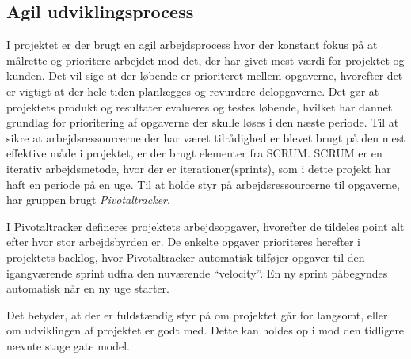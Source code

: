 



\subsection{Agil udviklingsprocess}
I projektet er der brugt en agil arbejdsprocess hvor der konstant fokus på at målrette og prioritere arbejdet mod det, der har givet mest værdi for projektet og kunden. Det vil sige at der løbende er prioriteret mellem opgaverne, hvorefter det er vigtigt at der hele tiden planlægges og revurdere delopgaverne. Det gør at projektets produkt og resultater evalueres og testes løbende, hvilket har dannet grundlag for prioritering af opgaverne der skulle løses i den næste periode. Til at sikre at arbejdsressourcerne der har været tilrådighed er blevet brugt på den mest effektive måde i projektet, er der brugt elementer fra SCRUM. SCRUM er en iterativ arbejdsmetode, hvor  der er iterationer(sprints), som i dette projekt har haft en periode på en uge. Til at holde styr på arbejdsressourcerne til opgaverne, har gruppen brugt \textit{Pivotaltracker}. 

I Pivotaltracker defineres projektets arbejdsopgaver, hvorefter de tildeles point alt efter hvor stor arbejdsbyrden er. De enkelte opgaver prioriteres herefter i projektets backlog, hvor Pivotaltracker automatisk tilføjer opgaver til den igangværende sprint udfra den nuværende “velocity”. En ny sprint påbegyndes automatisk når en ny uge starter.

Det betyder, at der er fuldstændig styr på om projektet går for langsomt, eller om udviklingen af projektet er godt med. Dette kan holdes op i mod den tidligere nævnte stage gate model.

